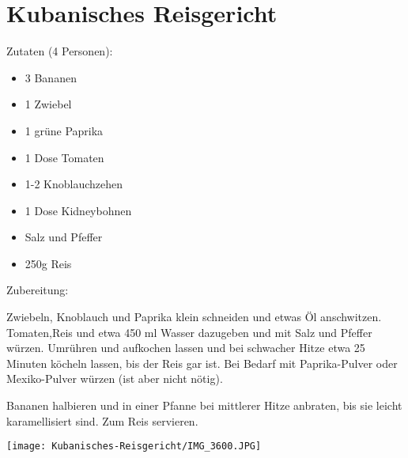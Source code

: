 \section{Kubanisches Reisgericht}
Zutaten (4 Personen):
\begin{itemize}
    \item 3 Bananen
    \item 1 Zwiebel
    \item 1 grüne Paprika
    \item 1 Dose Tomaten
    \item 1-2 Knoblauchzehen
    \item 1 Dose Kidneybohnen
    \item Salz und Pfeffer
    \item 250g Reis
\end{itemize}

\noindent Zubereitung:

\noindent Zwiebeln, Knoblauch und Paprika klein schneiden und etwas Öl
anschwitzen. Tomaten,Reis und etwa 450 ml Wasser dazugeben und mit Salz und
Pfeffer würzen. Umrühren und aufkochen lassen und bei schwacher Hitze etwa 25
Minuten köcheln lassen, bis der Reis gar ist. Bei Bedarf mit Paprika-Pulver
oder Mexiko-Pulver würzen (ist aber nicht nötig).

\noindent Bananen halbieren und in einer Pfanne bei mittlerer Hitze anbraten, bis sie
leicht karamellisiert sind. Zum Reis servieren.

\newpage
\mbox{}
\vfill
\begin{center}
    \texttt{[image: Kubanisches-Reisgericht/IMG\_3600.JPG]}
\end{center}
\vfill
\mbox{ }
\newpage
